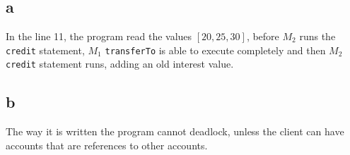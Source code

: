 \section{}

\subsection{a}
In the line 11, the program read the values $[20, 25, 30]$,
before $M_2$ runs the \texttt{credit} statement,
$M_1$ \texttt{transferTo} is able to execute completely and then $M_2$ \texttt{credit} statement runs,
adding an old interest value.

\subsection{b}
The way it is written the program cannot deadlock, unless the client can have accounts that are references to other accounts.